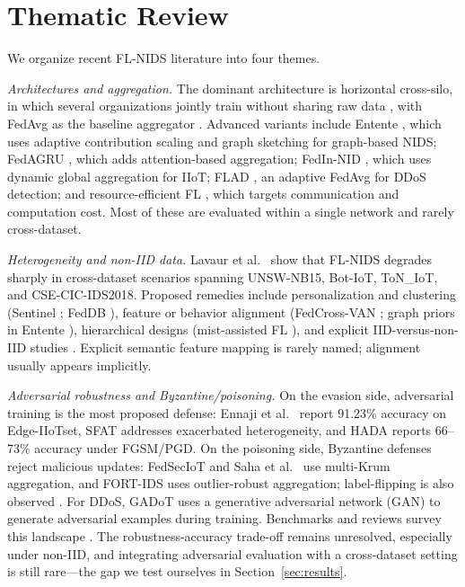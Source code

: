 \documentclass[conference]{IEEEtran}
\begin{document}
\section{Thematic Review}
\label{sec:related}
We organize recent FL-NIDS literature into four themes.

\textit{Architectures and aggregation.} The dominant architecture is horizontal
cross-silo, in which several organizations jointly train without sharing raw data
\cite{b1,b11}, with FedAvg as the baseline aggregator \cite{b1}. Advanced variants
include Entente \cite{b11}, which uses adaptive contribution scaling and graph
sketching for graph-based NIDS; FedAGRU \cite{b12}, which adds attention-based
aggregation; FedIn-NID \cite{b13}, which uses dynamic global aggregation for IIoT;
FLAD \cite{b14}, an adaptive FedAvg for DDoS detection; and resource-efficient FL
\cite{b15}, which targets communication and computation cost. Most of these are
evaluated within a single network and rarely cross-dataset.

\textit{Heterogeneity and non-IID data.} Lavaur et al.\ \cite{b5} show that FL-NIDS
degrades sharply in cross-dataset scenarios spanning UNSW-NB15, Bot-IoT, ToN\_IoT, and
CSE-CIC-IDS2018. Proposed remedies include personalization and clustering (Sentinel
\cite{b16}; FedDB \cite{b17}), feature or behavior alignment (FedCross-VAN \cite{b18};
graph priors in Entente \cite{b11}), hierarchical designs (mist-assisted FL
\cite{b19}), and explicit IID-versus-non-IID studies \cite{b20}. Explicit semantic
feature mapping is rarely named; alignment usually appears implicitly.

\textit{Adversarial robustness and Byzantine/poisoning.} On the evasion side,
adversarial training is the most proposed defense: Ennaji et al.\ \cite{b21} report
91.23\% accuracy on Edge-IIoTset, SFAT \cite{b6} addresses exacerbated heterogeneity,
and HADA \cite{b22} reports 66--73\% accuracy under FGSM/PGD. On the poisoning side,
Byzantine defenses reject malicious updates: FedSecIoT \cite{b23} and Saha et al.\
\cite{b7} use multi-Krum aggregation, and FORT-IDS \cite{b24} uses outlier-robust
aggregation; label-flipping is also observed \cite{b5}. For DDoS, GADoT \cite{b25} uses
a generative adversarial network (GAN) to generate adversarial examples during training. Benchmarks and reviews survey
this landscape \cite{b26,b8,b27}. The robustness-accuracy trade-off remains unresolved,
especially under non-IID, and integrating adversarial evaluation with a cross-dataset
setting is still rare---the gap we test ourselves in Section~\ref{sec:results}.
\end{document}
